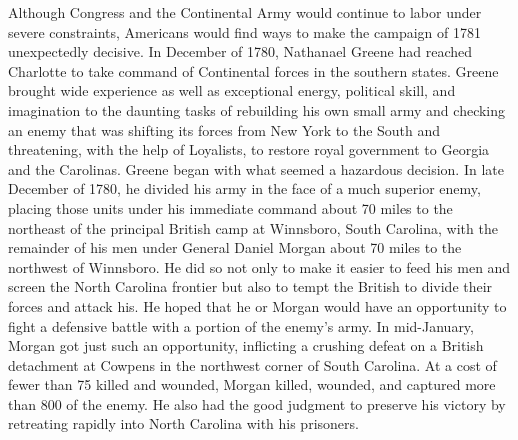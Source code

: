 Although Congress and the Continental Army would continue to labor under severe
constraints, Americans would find ways to make the campaign of 1781 unexpectedly
decisive. In December of 1780, Nathanael Greene had reached Charlotte to take command
of Continental forces in the southern states. Greene brought wide experience as well as
exceptional energy, political skill, and imagination to the daunting tasks of rebuilding his
own small army and checking an enemy that was shifting its forces from New York to the
South and threatening, with the help of Loyalists, to restore royal government to Georgia
and the Carolinas. Greene began with what seemed a hazardous decision. In late December
of 1780, he divided his army in the face of a much superior enemy, placing those units
under his immediate command about 70 miles to the northeast of the principal British
camp at Winnsboro, South Carolina, with the remainder of his men under General Daniel
Morgan about 70 miles to the northwest of Winnsboro. He did so not only to make it easier
to feed his men and screen the North Carolina frontier but also to tempt the British to divide
their forces and attack his. He hoped that he or Morgan would have an opportunity to fight
a defensive battle with a portion of the enemy's army. In mid-January, Morgan got just
such an opportunity, inflicting a crushing defeat on a British detachment at Cowpens in the
northwest corner of South Carolina. At a cost of fewer than 75 killed and wounded, Morgan
killed, wounded, and captured more than 800 of the enemy. He also had the good judgment
to preserve his victory by retreating rapidly into North Carolina with his prisoners.

